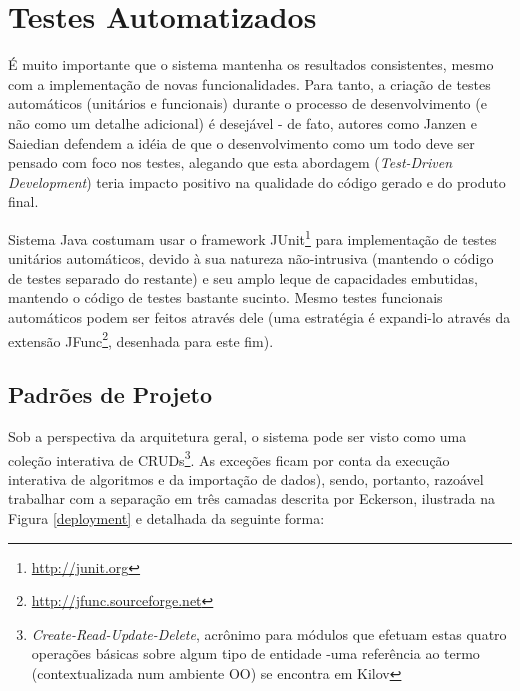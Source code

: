 \documentclass{abnt}
\begin{document}
\section{Testes Automatizados}

É muito importante que o sistema mantenha os resultados consistentes, mesmo com a implementação de novas funcionalidades. Para tanto, a criação de testes automáticos (unitários e funcionais) durante o processo de desenvolvimento (e não como um detalhe adicional) é desejável - de fato, autores como Janzen e Saiedian\cite{Janzen_Saiedian} defendem a idéia de que o desenvolvimento como um todo deve ser pensado com foco nos testes, alegando que esta abordagem (\textit{Test-Driven Development}) teria impacto positivo na qualidade do código gerado e do produto final.

Sistema Java costumam usar o framework JUnit\footnote{\url{http://junit.org}} para implementação de testes unitários automáticos, devido à sua natureza não-intrusiva (mantendo o código de testes separado do restante) e seu amplo leque de capacidades embutidas, mantendo o código de testes bastante sucinto. Mesmo testes funcionais automáticos podem ser feitos através dele (uma estratégia é expandi-lo através da extensão JFunc\footnote{\url{http://jfunc.sourceforge.net}}, desenhada para este fim).

\subsection{Padrões de Projeto}

Sob a perspectiva da arquitetura geral, o sistema pode ser visto como uma coleção interativa de CRUDs\footnote{\textit{Create-Read-Update-Delete}, acrônimo para módulos que efetuam estas quatro operações básicas sobre algum tipo de entidade -uma referência ao termo (contextualizada num ambiente OO) se encontra em Kilov\cite{kilov_crud}}. As exceções ficam por conta da execução interativa de algoritmos e da importação de dados), sendo, portanto, razoável trabalhar com a separação em três camadas descrita por Eckerson\cite{Eckerson1995}, ilustrada na Figura \ref{deployment} e detalhada da seguinte forma:
\end{document}

